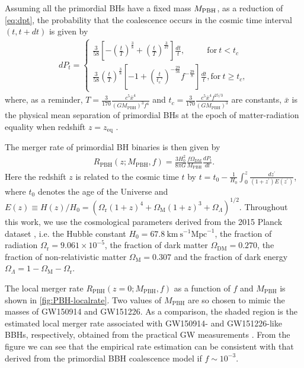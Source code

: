 Assuming all the primordial \acp{BH} have a fixed mass $M_{\rm PBH}$, as a reduction of \cref{eq:dpt}, the probability that the coalescence occurs in the cosmic time interval $(t,t+dt)$ is given by
\begin{align}
	dP_t=
	\begin{cases}
		\frac{3}{58}\left[-\left(\frac{t}{T}\right)^{\frac{3}{8}}+\left(\frac{t}{T}\right)^{\frac{3}{37}}\right]\frac{dt}{t},~~~~~~~~~~~~\textrm{for}~ t< t_c\\
		\frac{3}{58}\left(\frac{t}{T}\right)^{\frac{3}{8}}\left[-1+\left(\frac{t}{t_c'}\right)^{-\frac{29}{56}}f^{-\frac{29}{8}}\right]\frac{dt}{t},\textrm{for}~ t\geq t_c,
	\end{cases}
	\label{dpt}
\end{align}
where, as a reminder, $T=\frac{3}{170}\frac{c^5{\bar{x}}^4}{ (G M_{\textrm{PBH}})^3 f^4}$ and $t_c = \frac{3}{170}\frac{c^5 {\bar{x}}^4 f^{25/3}}{ (G M_{\textrm{PBH}})^3}$ are constants, $\bar{x}$ is the physical mean separation of primordial \acp{BH} at the epoch of matter-radiation equality when redshift $z= z_{\textrm{eq}}$ \cite{Sasaki:2016jop}.

The merger rate of primordial \ac{BH} binaries is then given by
\begin{align}
	R_{\textrm{PBH}}(z;M_\text{PBH},f)=\frac{3H_0^2}{8\pi G}\frac{f\Omega_{\textrm{DM}}}{M_{\textrm{PBH}}}\frac{dP_t}{dt}.
	\label{merger rate}
\end{align}
Here the redshift $z$ is related to the cosmic time $t$ by $t=t_0-\frac1{H_0}\int_{0}^{z}\frac{dz^\prime}{(1+z^\prime)E(z^\prime)}$, where $t_0$ denotes the age of the Universe and $E(z)\equiv H(z)/H_0=\left(\Omega_{\textrm{r}}(1+z)^4+\Omega_{\textrm{M}}(1+z)^3+\Omega_{\Lambda}\right)^{{1}/{2}}$.
Throughout this work, we use the cosmological parameters derived from the 2015 Planck dataset \cite{Ade:2015xua}, i.e. the Hubble constant $H_0=67.8~\textrm{km}~\textrm{s}^{-1}\textrm{Mpc}^{-1}$, the fraction of radiation $\Omega_{\textrm{r}}=9.061\times 10^{-5}$, the fraction of dark matter $\Omega_{\textrm{DM}}=0.270$, the fraction of non-relativistic matter $\Omega_{\textrm{M}}=0.307$ and the fraction of dark energy $\Omega_\Lambda=1-\Omega_{\textrm{M}}-\Omega_{\textrm{r}}$.

The local merger rate $R_\text{PBH}(z=0;M_\text{PBH},f)$ as a function of $f$ and $M_\text{PBH}$ is shown in \cref{fig:PBH-localrate}.
Two values of $M_\text{PBH}$ are so chosen to mimic the masses of GW150914 and GW151226.  
As a comparison, the shaded region is the estimated local merger rate associated with GW150914- and GW151226-like \acp{BBH}, respectively, obtained from the practical \ac{GW} measurements \cite{GW150914rate,O1}.
From the figure we can see that the empirical rate estimation can be consistent with that derived from the primordial \ac{BBH} coalescence model if $f\sim 10^{-3}$.

